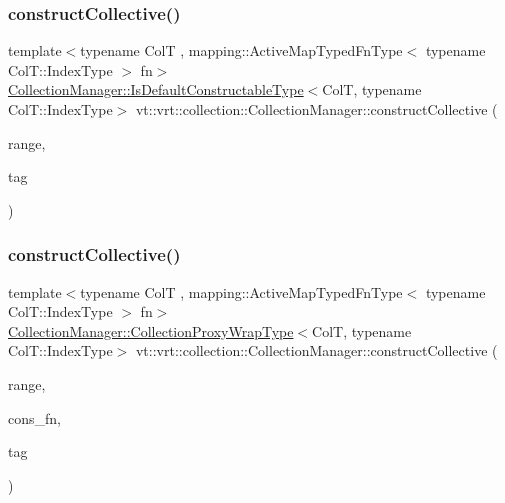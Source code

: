 \subsubsection{\texorpdfstring{construct\+Collective()}{constructCollective()}\hspace{0.1cm}{\footnotesize\ttfamily [5/6]}}
{\footnotesize\ttfamily template$<$typename ColT , mapping\+::\+Active\+Map\+Typed\+Fn\+Type$<$ typename Col\+T\+::\+Index\+Type $>$ fn$>$ \\
\hyperlink{structvt_1_1vrt_1_1collection_1_1_collection_manager_af8091fcb8218dad155ea028c9b5d283f}{Collection\+Manager\+::\+Is\+Default\+Constructable\+Type}$<$ColT, typename Col\+T\+::\+Index\+Type$>$ vt\+::vrt\+::collection\+::\+Collection\+Manager\+::construct\+Collective (\begin{DoxyParamCaption}\item[{typename Col\+T\+::\+Index\+Type}]{range,  }\item[{\hyperlink{namespacevt_a84ab281dae04a52a4b243d6bf62d0e52}{Tag\+Type} const \&}]{tag }\end{DoxyParamCaption})}

\mbox{\label{structvt_1_1vrt_1_1collection_1_1_collection_manager_a9b376e8e7145bf3d0f6b268d7974f783}} 
\subsubsection{\texorpdfstring{construct\+Collective()}{constructCollective()}\hspace{0.1cm}{\footnotesize\ttfamily [6/6]}}
{\footnotesize\ttfamily template$<$typename ColT , mapping\+::\+Active\+Map\+Typed\+Fn\+Type$<$ typename Col\+T\+::\+Index\+Type $>$ fn$>$ \\
\hyperlink{structvt_1_1vrt_1_1collection_1_1_collection_manager_a56458ed7f9bb22b631b9b3a745f42f94}{Collection\+Manager\+::\+Collection\+Proxy\+Wrap\+Type}$<$ColT, typename Col\+T\+::\+Index\+Type$>$ vt\+::vrt\+::collection\+::\+Collection\+Manager\+::construct\+Collective (\begin{DoxyParamCaption}\item[{typename Col\+T\+::\+Index\+Type}]{range,  }\item[{\hyperlink{structvt_1_1vrt_1_1collection_1_1_collection_manager_a7503830bc133013d542856fa39834dcc}{Distrib\+Construct\+Fn}$<$ ColT $>$}]{cons\+\_\+fn,  }\item[{\hyperlink{namespacevt_a84ab281dae04a52a4b243d6bf62d0e52}{Tag\+Type} const \&}]{tag }\end{DoxyParamCaption})}

